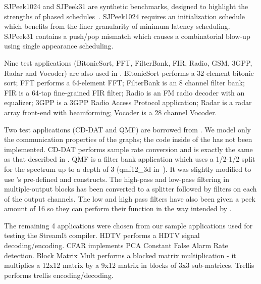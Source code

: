 \documentclass{sig-alt-full}
\begin{document}
SJPeek1024 and SJPeek31 are synthetic benchmarks, designed to
highlight the strengths of phased schedules~\cite{karczma-thesis}.
SJPeek1024 requires an initialization schedule which benefits from the
finer granularity of minimum latency scheduling. SJPeek31 contains a
push/pop mismatch which causes a combinatorial blow-up using single
appearance scheduling.

Nine test applications (BitonicSort, FFT, FilterBank, FIR, Radio, GSM,
3GPP, Radar and Vocoder) are also used in \cite{Gordo02}. BitonicSort
performs a 32 element bitonic sort; FFT performs a 64-element FFT;
FilterBank is an 8 channel filter bank; FIR is a 64-tap fine-grained
FIR filter; Radio is an FM radio decoder with an equalizer; 3GPP is a
3GPP Radio Access Protocol application; Radar is a radar array
front-end with beamforming; Vocoder is a 28 channel Vocoder.

Two test applications (CD-DAT and QMF) are borrowed from
\cite{murt2000x2}. We model only the communication properties of the
graphs; the code inside of the {\filters} has not been implemented.
CD-DAT performs sample rate conversion and is exactly the same as that
described in \cite{murt2000x2}.  QMF is a filter bank application
which uses a 1/2-1/2 split for the spectrum up to a depth of 3
(qmf12\_3d in~\cite{murt2000x2}).  It was slightly modified to use
{\StreamIt}'s pre-defined {\splitter} and {\joiner} constructs.  The
high-pass and low-pass filtering in multiple-output blocks has been
converted to a splitter followed by filters on each of the output
channels. The low and high pass filters have also been given a peek
amount of 16 so they can perform their function in the way intended by
{\StreamIt}.

The remaining 4 applications were chosen from our sample applications
used for testing the StreamIt compiler. HDTV performs a HDTV signal
decoding/encoding. CFAR implements PCA Constant False Alarm Rate
detection. Block Matrix Mult performs a blocked matrix multiplication
- it multiplies a 12x12 matrix by a 9x12 matrix in blocks of 3x3
sub-matrices. Trellis performs trellis encoding/decoding.

\begin{comment}

\subsection{Methodology}
\label{sec:results:methodology}

The following data has been collected: number of nodes, number of
node executions per steady state, schedule size and buffer size
for pseudo single appearance and minimal latency schedules.

\subsubsection{Schedule Compression}

\end{comment}
\end{document}
